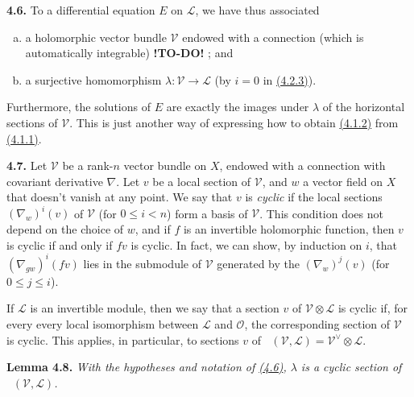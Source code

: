 \documentclass{report}
\newenvironment{itenv}[1]
  {\phantomsection\par\medskip\noindent\textbf{#1.}\itshape}
  {\par\medskip}
\newenvironment{rmenv}[1]
  {\phantomsection\par\medskip\noindent\textbf{#1.}\rmfamily}
  {\par\medskip}
\newcommand{\scr}[1]{{\mathscr{#1}}}
\renewcommand{\cal}[1]{{\mathcal{#1}}}
\renewcommand{\leq}{\leqslant}
\DeclareMathOperator{\shHom}{\underline{Hom}}
\newcommand{\todo}{\textbf{ !TO-DO! }}
\newcommand{\oldpage}[1]{\marginpar{\footnotesize$\Big\vert$ \textit{p.~#1}}}
\begin{document}
\begin{rmenv}{4.6}
\label{I.4.6}
  To a differential equation $E$ on $\scr{L}$, we have thus associated
  \begin{enumerate}[a)]
    \item a holomorphic vector bundle $\cal{V}$ endowed with a connection (which is automatically integrable) \todo ; and
    \item a surjective homomorphism $\lambda\colon\cal{V}\to\scr{L}$ (by $i=0$ in \hyperref[I.4.2.3]{(4.2.3)}).
  \end{enumerate}
  Furthermore, the solutions of $E$ are exactly the images under $\lambda$ of the horizontal sections of $\cal{V}$.
  This is just another way of expressing how to obtain \hyperref[I.4.1.2]{(4.1.2)} from \hyperref[I.4.1.1]{(4.1.1)}.
\end{rmenv}

\oldpage{26}
\begin{rmenv}{4.7}
\label{I.4.7}
  Let $\cal{V}$ be a rank-$n$ vector bundle on $X$, endowed with a connection with covariant derivative $\nabla$.
  Let $v$ be a local section of $\cal{V}$, and $w$ a vector field on $X$ that doesn't vanish at any point.
  We say that $v$ is \emph{cyclic} if the local sections $(\nabla_w)^i(v)$ of $\cal{V}$ (for $0\leq i<n$) form a basis of $\cal{V}$.
  This condition does not depend on the choice of $w$, and if $f$ is an invertible holomorphic function, then $v$ is cyclic if and only if $fv$ is cyclic.
  In fact, we can show, by induction on $i$, that $(\nabla_{gw})^i(fv)$ lies in the submodule of $\cal{V}$ generated by the $(\nabla_w)^j(v)$ (for $0\leq j\leq i$).

  If $\scr{L}$ is an invertible module, then we say that a section $v$ of $\cal{V}\otimes\scr{L}$ is cyclic if, for every every local isomorphism between $\scr{L}$ and $\cal{O}$, the corresponding section of $\cal{V}$ is cyclic.
  This applies, in particular, to sections $v$ of $\shHom(\cal{V},\scr{L})=\cal{V}^\vee\otimes\scr{L}$.
\end{rmenv}

\begin{itenv}{Lemma 4.8}
\label{I.4.8}
  With the hypotheses and notation of \hyperref[I.4.6]{(4.6)}, $\lambda$ is a cyclic section of $\shHom(\cal{V},\scr{L})$.
\end{itenv}
\end{document}
